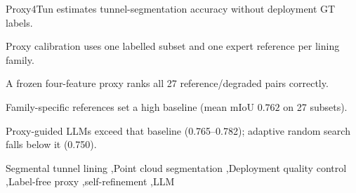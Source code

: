 \documentclass[a4paper,fleqn]{cas-dc}
\begin{document}
{\begin{abstract}
Tunnel-lining segmentation supports point-cloud inspection, but changing tunnel conditions and scarce reference labels complicate quality assessment on new scans. Proxy4Tun estimates segmentation accuracy from intermediate pipeline metrics without ground-truth (GT) labels at deployment. Proxy calibration uses one labelled subset and one expert reference per lining family. Across three Seg2Tunnel families, bounded sampling and uncertainty-guided Bayesian exploration produce 120 calibration runs, from which a four-feature ridge-regression proxy is frozen. On 54 paired runs from 27 held-out subsets, the proxy achieves Spearman $\rho=0.791$ and MAE~$0.106$, and ranks all 27 reference/degraded pairs correctly. Self-refinement is then tested against a high bar: the same family-specific references on all 27 held-out subsets, whose mean mIoU is already $0.762$. Under an identical three-round budget and proxy-based selection rule, Fable, Gemini~3.8, and GPT-5.6 medium raise the selected mean to $0.774$, $0.782$, and $0.765$, whereas adaptive random search falls to $0.750$. These results show that limited development supervision can support deployment quality control and that useful refinement on strong engineering references requires both an independently validated proxy and informative LLM proposals.
\end{abstract}



\begin{highlights}
\item Proxy4Tun estimates tunnel-segmentation accuracy without deployment GT labels.
\item Proxy calibration uses one labelled subset and one expert reference per lining family.
\item A frozen four-feature proxy ranks all 27 reference/degraded pairs correctly.
\item Family-specific references set a high baseline (mean mIoU $0.762$ on 27 subsets).
\item Proxy-guided LLMs exceed that baseline (0.765--0.782); adaptive random search falls below it (0.750).
\end{highlights}

\begin{keywords}
Segmental tunnel lining \sep Point cloud segmentation \sep Deployment quality control \sep Label-free proxy \sep self-refinement \sep LLM
\end{keywords}
\date{\today}

}
\end{document}
